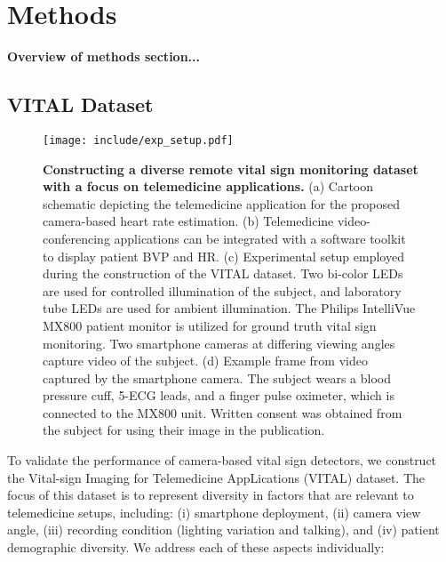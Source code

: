 %
%

\chapter{Methods}

\textbf{Overview of methods section...}

\section{VITAL Dataset}

\begin{figure}
    \centering
    \texttt{[image: include/exp\_setup.pdf]}
    \caption{\textbf{Constructing a diverse remote vital sign monitoring dataset with a focus on telemedicine applications.} (a) Cartoon schematic depicting the telemedicine application for the proposed camera-based heart rate estimation. (b) Telemedicine video-conferencing applications can be integrated with a software toolkit to display patient BVP and HR. (c) Experimental setup employed during the construction of the VITAL dataset. Two bi-color LEDs are used for controlled illumination of the subject, and laboratory tube LEDs are used for ambient illumination. The Philips IntelliVue MX800 patient monitor is utilized for ground truth vital sign monitoring. Two smartphone cameras at differing viewing angles capture video of the subject. (d) Example frame from video captured by the smartphone camera. The subject wears a blood pressure cuff, 5-ECG leads, and a finger pulse oximeter, which is connected to the MX800 unit. Written consent was obtained from the subject for using their image in the publication.}
    \label{fig:exp_setup}
\end{figure}

To validate the performance of camera-based vital sign detectors, we construct the Vital-sign Imaging for Telemedicine AppLications (VITAL) dataset. The focus of this dataset is to represent diversity in factors that are relevant to telemedicine setups, including: (i) smartphone deployment, (ii) camera view angle, (iii) recording condition (lighting variation and talking), and (iv) patient demographic diversity. We address each of these aspects individually:

